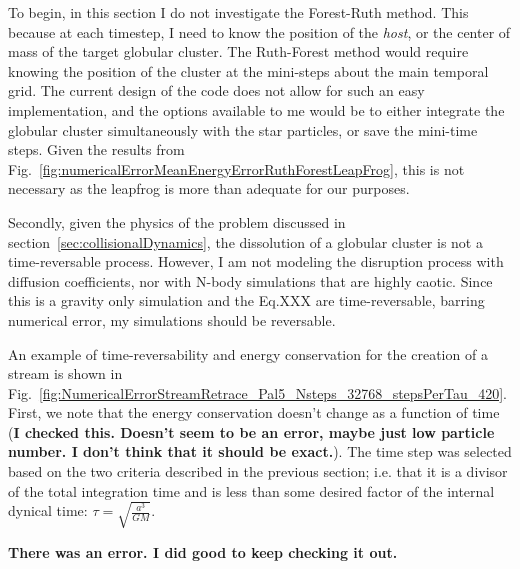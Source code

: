         To begin, in this section I do not investigate the Forest-Ruth method. This because at each timestep, I need to know the position of the \textit{host}, or the center of mass of the target globular cluster. The Ruth-Forest method would require knowing the position of the cluster at the mini-steps about the main temporal grid. The current design of the code does not allow for such an easy implementation, and the options available to me would be to either integrate the globular cluster simultaneously with the star particles, or save the mini-time steps. Given the results from Fig.~\ref{fig:numericalErrorMeanEnergyErrorRuthForestLeapFrog}, this is not necessary as the leapfrog is more than adequate for our purposes. 

        Secondly, given the physics of the problem discussed in section~\ref{sec:collisionalDynamics}, the dissolution of a globular cluster is not a time-reversable process. However, I am not modeling the disruption process with diffusion coefficients, nor with N-body simulations that are highly caotic. Since this is a gravity only simulation and the Eq.XXX are time-reversable, barring numerical error, my simulations should be reversable. 

        An example of time-reversability and energy conservation for the creation of a stream is shown in Fig.~\ref{fig:NumericalErrorStreamRetrace_Pal5_Nsteps_32768_stepsPerTau_420}. First, we note that the energy conservation doesn't change as a function of time (\textbf{I checked this. Doesn't seem to be an error, maybe just low particle number. I don't think that it should be exact.}). The time step was selected based on the two criteria described in the previous section; i.e. that it is a divisor of the total integration time and is less than some desired factor of the internal dynical time: $\tau = \sqrt{\frac{a^3}{GM}}$.  


        \textbf{There was an error. I did good to keep checking it out.}


